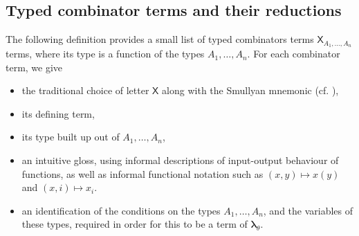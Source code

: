 \documentclass{lmcs} %
\newcommand{\param}{\theta}
\newcommand{\mltup}{\boldsymbol\lambda_{\param}}
\begin{document}
\subsection{Typed combinator terms and their reductions}\label{sec:typedcomboterms}

The following definition provides a small list of typed combinators terms $\mathsf{X}_{A_1, \ldots, A_n}$ terms, where its type is a function of the types $A_1, \ldots, A_n$. For each combinator term, we give
\begin{itemize}[leftmargin=*]
\item the traditional choice of letter $\mathsf{X}$ along with the Smullyan mnemonic (cf. \cite{Smullyan2000-fo}), 
\item its defining term, 
\item its type built up out of $A_1, \ldots, A_n$,
\item an intuitive gloss, using informal descriptions of input-output behaviour of functions, as well as informal functional notation such as $(x,y)\mapsto x(y)$ and $(x,i)\mapsto x_i$.
\item an identification of the conditions on the types $A_1, \ldots, A_n$, and the variables of these types, required in order for this to be a term of $\mltup$.
\end{itemize}
\end{document}
